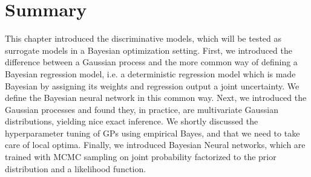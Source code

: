 




\newpage

\section{Summary}
This chapter introduced the discriminative models, which will be tested as surrogate models in a
Bayesian optimization setting. First, we introduced the difference between a Gaussian process and
the more common way of defining a Bayesian regression model, i.e. a deterministic regression model
which is made Bayesian by assigning its weights and regression output a joint uncertainty. We define
the Bayesian neural network in this common way. Next, we introduced the Gaussian processes and found
they, in practice, are multivariate Gaussian distributions, yielding nice exact inference. We
shortly discussed the hyperparameter tuning of GPs using empirical Bayes, and that we need to take
care of local optima. Finally, we introduced Bayesian Neural networks, which are trained with MCMC
sampling on joint probability factorized to the prior distribution and a likelihood function. 



